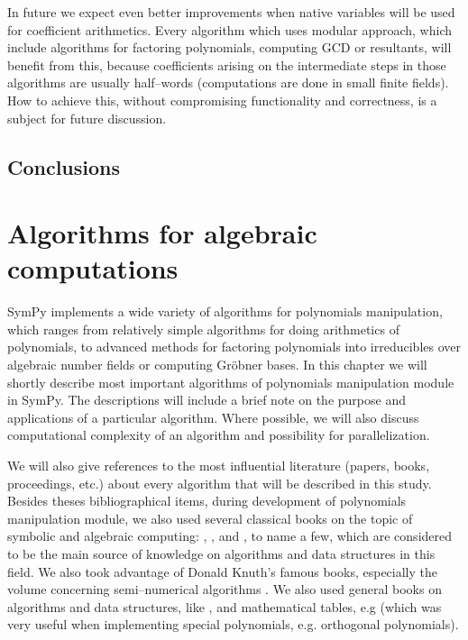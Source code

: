 In future we expect even better improvements when native variables will be used for coefficient
arithmetics. Every algorithm which uses modular approach, which include algorithms for factoring
polynomials, computing GCD or resultants, will benefit from this, because coefficients arising
on the intermediate steps in those algorithms are usually half--words (computations are done in
small finite fields). How to achieve this, without compromising functionality and correctness,
is a subject for future discussion.


\section{Conclusions}



\chapter{Algorithms for algebraic computations}\label{thesis-algorithms}

SymPy implements a wide variety of algorithms for polynomials manipulation, which ranges from
relatively simple algorithms for doing arithmetics of polynomials, to advanced methods for
factoring polynomials into irreducibles over algebraic number fields or computing Gröbner
bases. In this chapter we will shortly describe most important algorithms of polynomials
manipulation module in SymPy. The descriptions will include a brief note on the purpose and
applications of a particular algorithm. Where possible, we will also discuss computational
complexity of an algorithm and possibility for parallelization.

We will also give references to the most influential literature (papers, books, proceedings, etc.)
about every algorithm that will be described in this study. Besides theses bibliographical items,
during development of polynomials manipulation module, we also used several classical books on the
topic of symbolic and algebraic computing: \cite{Davenport1988systems}, \cite{Geddes1992algorithms},
\cite{Gathen1999modern} and \cite{Grabmeier2003algebra}, to name a few, which are considered to be the
main source of knowledge on algorithms and data structures in this field. We also took advantage
of Donald Knuth's famous books, especially the volume concerning semi--numerical algorithms
\cite{Knuth1985seminumerical}. We also used general books on algorithms and data structures, like
\cite{Cormen2001algorithms}, and mathematical tables, e.g \cite{Abramowitz1964handbook} (which was very
useful when implementing special polynomials, e.g. orthogonal polynomials).


